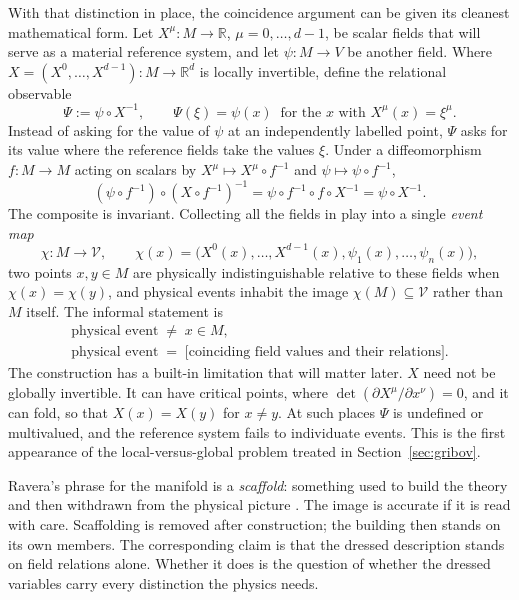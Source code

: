 \documentclass[11pt]{article}
\theoremstyle{plain}
\theoremstyle{definition}
\theoremstyle{remark}
\begin{document}
With that distinction in place, the coincidence argument can be given its cleanest mathematical form. Let $X^\mu:M\to\mathbb R$, $\mu=0,\dots,d-1$, be scalar fields that will serve as a material reference system, and let $\psi:M\to V$ be another field. Where $X=(X^0,\dots,X^{d-1}):M\to\mathbb R^d$ is locally invertible, define the relational observable
\begin{equation}\label{eq:relobs}
\Psi:=\psi\circ X^{-1},\qquad \Psi(\xi)=\psi(x)\ \text{ for the } x \text{ with } X^\mu(x)=\xi^\mu .
\end{equation}
Instead of asking for the value of $\psi$ at an independently labelled point, $\Psi$ asks for its value where the reference fields take the values $\xi$. Under a diffeomorphism $f:M\to M$ acting on scalars by $X^\mu\mapsto X^\mu\circ f^{-1}$ and $\psi\mapsto\psi\circ f^{-1}$,
\begin{equation}
(\psi\circ f^{-1})\circ(X\circ f^{-1})^{-1}=\psi\circ f^{-1}\circ f\circ X^{-1}=\psi\circ X^{-1}.
\end{equation}
The composite is invariant. Collecting all the fields in play into a single \emph{event map}
\begin{equation}
\chi:M\to\mathcal V,\qquad \chi(x)=\big(X^0(x),\dots,X^{d-1}(x),\psi_1(x),\dots,\psi_n(x)\big),
\end{equation}
two points $x,y\in M$ are physically indistinguishable relative to these fields when $\chi(x)=\chi(y)$, and physical events inhabit the image $\chi(M)\subseteq\mathcal V$ rather than $M$ itself. The informal statement is
\begin{equation}\label{eq:event}
\begin{gathered}
\text{physical event}\;\neq\; x\in M,\\
\text{physical event}\;=\;\big[\text{coinciding field values and their relations}\big].
\end{gathered}
\end{equation}
The construction has a built-in limitation that will matter later. $X$ need not be globally invertible. It can have critical points, where $\det(\partial X^\mu/\partial x^\nu)=0$, and it can fold, so that $X(x)=X(y)$ for $x\neq y$. At such places $\Psi$ is undefined or multivalued, and the reference system fails to individuate events. This is the first appearance of the local-versus-global problem treated in Section~\ref{sec:gribov}.

Ravera's phrase for the manifold is a \emph{scaffold}: something used to build the theory and then withdrawn from the physical picture \cite{toe}. The image is accurate if it is read with care. Scaffolding is removed after construction; the building then stands on its own members. The corresponding claim is that the dressed description stands on field relations alone. Whether it does is the question of whether the dressed variables carry every distinction the physics needs.
\end{document}
